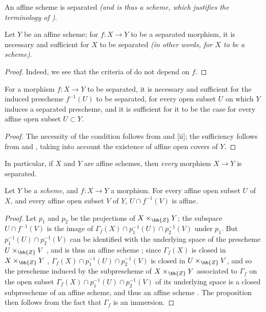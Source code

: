 \begin{corollary}[5.5.7]
\label{I.5.5.7}
An affine scheme is separated \emph{(and is thus a \emph{scheme}, which justifies the terminology of )}.
\end{corollary}

\begin{corollary}[5.5.8]
\label{I.5.5.8}
Let $Y$ be an affine scheme;
for $f:X\to Y$ to be a separated morphism, it is necessary and sufficient for $X$ to be separated \emph{(in other words, for $X$ to be a \emph{scheme})}.
\end{corollary}

\begin{proof}
Indeed, we see that the criteria of  do not depend on $f$.
\end{proof}

\begin{corollary}[5.5.9]
\label{I.5.5.9}
For a morphism $f:X\to Y$ to be separated, it is necessary and sufficient for the induced prescheme $f^{-1}(U)$ to be separated, for every open subset $U$ on which $Y$ induces a separated prescheme, and it is sufficient for it to be the case for every affine open subset $U\subset Y$.
\end{corollary}

\begin{proof}
The necessity of the condition follows from  and [ii];
the sufficiency follows from  and , taking into account the existence of affine open covers of $Y$.
\end{proof}

In particular, if $X$ and $Y$ are affine schemes, then \emph{every} morphism $X\to Y$ is separated.

\begin{proposition}[5.5.10]
\label{I.5.5.10}
Let $Y$ be a \emph{scheme}, and $f:X\to Y$ a morphism.
For every affine open subset $U$ of $X$, and every affine open subset $V$ of $Y$, $U\cap f^{-1}(V)$ is affine.
\end{proposition}

\begin{proof}
Let $p_1$ and $p_2$ be the projections of $X\times_\bb{Z}Y$;
the subspace $U\cap f^{-1}(V)$ is the image of $\Gamma_f(X)\cap p_1^{-1}(U)\cap p_2^{-1}(V)$ under $p_1$.
But $p_1^{-1}(U)\cap p_2^{-1}(V)$ can be identified with the underlying space of the
prescheme $U\times_\bb{Z}V$ , and is thus an affine scheme ;
since $\Gamma_f(X)$ is closed in $X\times_\bb{Z}Y$ , $\Gamma_f(X)\cap p_1^{-1}(U)\cap p_2^{-1}(V)$ is closed in $U\times_\bb{Z} V$, and so the prescheme induced by the subprescheme of $X\times_\bb{Z}Y$ associated to $\Gamma_f$  on the open subset $\Gamma_f(X)\cap p_1^{-1}(U)\cap p_2^{-1}(V)$ of its underlying space is a closed subprescheme of an affine scheme, and thus an affine scheme .
The proposition then follows from the fact that $\Gamma_f$ is an immersion.
\end{proof}


